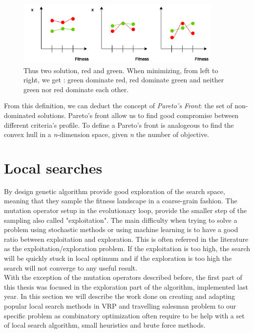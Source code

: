 \documentclass[12pt]{memoir}
\begin{document}
\begin{figure}[htbp]
	\begin{center}
		\includegraphics[width=4in]{img/paretoDominance.png}
		\caption{Thus two solution, red and green. When minimizing, from left to right, we get : green dominate red, red dominate green and neither green nor red dominate each other.}
	\end{center}
\end{figure}



From this definition, we can deduct the concept of \emph{Pareto's Front}: the set
of non-dominated solutions. Pareto's front allow us to find good compromise between
different criteria's profile. To define a Pareto's front is analogeous to find the convex
hull\cite{godfrey2007algorithms} in a \textit{n}-dimension space, given \textit{n} the number of objective.

\label{par:Multi-objective selection }


\section{Local searches}
By design genetic algorithm provide good exploration of the search space, meaning
that they sample the fitness landscape in a coarse-grain fashion.
The mutation operator setup in the evolutionary loop, provide the smaller step
of the sampling also called "exploitation". The main difficulty when trying to 
solve a problem using stochastic methods or using machine learning is to have a
good ratio between exploitation and exploration. This is often referred in the
literature as the exploitation/exploration problem. If the exploitation is too high,
the search will be quickly stuck in local optimum and if the exploration is too high
the search will not converge to any useful result. \\
With the exception of the mutation operators described before, the first part of this
thesis was focused in the exploration part of the algorithm, implemented last year.
In this section we will describe the work done on creating and adapting popular local
search methods in VRP and travelling salesman problem to our specific problem as combinatory
optimization often require to be help with a set of local search algorithm, small heuristics and brute force methods.
\end{document}
